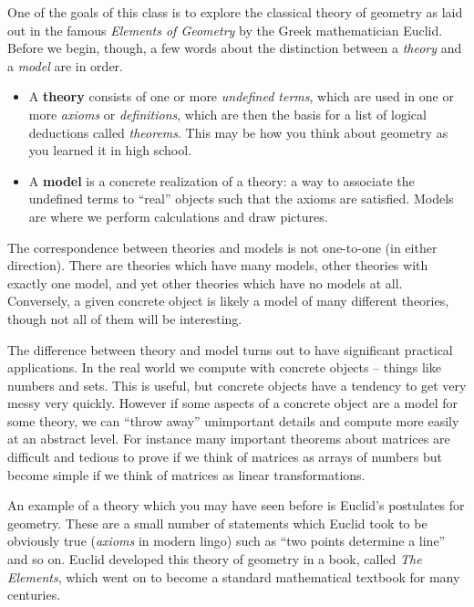 One of the goals of this class is to explore the classical theory of geometry as laid out in the famous \emph{Elements of Geometry} by the Greek mathematician Euclid.
Before we begin, though, a few words about the distinction between a \emph{theory} and a \emph{model} are in order.

\begin{itemize}
\item A \textbf{theory} consists of one or more \emph{undefined terms}, which are used in one or more \emph{axioms} or \emph{definitions}, which are then the basis for a list of logical deductions called \emph{theorems}.
This may be how you think about geometry as you learned it in high school.

\item A \textbf{model} is a concrete realization of a theory: a way to associate the undefined terms to ``real'' objects such that the axioms are satisfied.
Models are where we perform calculations and draw pictures.
\end{itemize}

The correspondence between theories and models is not one-to-one (in either direction).
There are theories which have many models, other theories with exactly one model, and yet other theories which have no models at all.
Conversely, a given concrete object is likely a model of many different theories, though not all of them will be interesting.

The difference between theory and model turns out to have significant practical applications.
In the real world we compute with concrete objects -- things like numbers and sets.
This is useful, but concrete objects have a tendency to get very messy very quickly.
However if some aspects of a concrete object are a model for some theory, we can ``throw away'' unimportant details and compute more easily at an abstract level.
For instance many important theorems about matrices are difficult and tedious to prove if we think of matrices as arrays of numbers but become simple if we think of matrices as linear transformations.

An example of a theory which you may have seen before is Euclid's postulates for geometry.
These are a small number of statements which Euclid took to be obviously true (\emph{axioms} in modern lingo) such as ``two points determine a line'' and so on.
Euclid developed this theory of geometry in a book, called \emph{The Elements}, which went on to become a standard mathematical textbook for many centuries.

